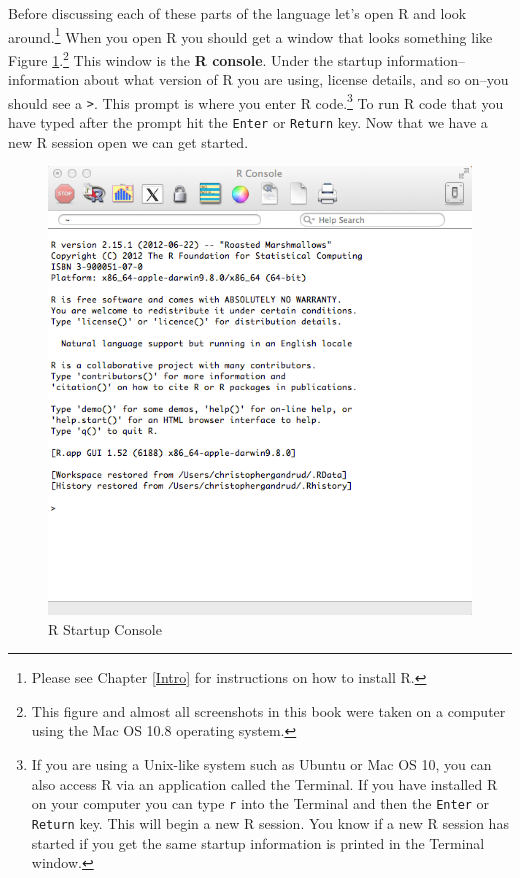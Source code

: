 Before discussing each of these parts of the language let's open R and look around.\footnote{Please see Chapter \ref{Intro} for instructions on how to install R.} When you open R you should get a window that looks something like Figure \ref{RBlankMain}.\footnote{This figure and almost all screenshots in this book were taken on a computer using the Mac OS 10.8 operating system.} This window is the {\bf{R console}}. Under the startup information--information about what version of R you are using, license details, and so on--you should see a {\tt{\textgreater}}. This prompt is where you enter R code.\footnote{If you are using a Unix-like system such as Ubuntu or Mac OS 10, you can also access R via an application called the Terminal. If you have installed R on your computer you can type {\tt{r}} into the Terminal and then the {\tt{Enter}} or {\tt{Return}} key. This will begin a new R session. You know if a new R session has started if you get the same startup information is printed in the Terminal window.} To run R code that you have typed after the prompt hit the {\tt{Enter}} or {\tt{Return}} key. Now that we have a new R session open we can get started. 

\begin{figure}[th!]
    \caption{R Startup Console}
    \label{RBlankMain}
    \begin{center}
    \includegraphics[scale=0.4]{Children/Chapter3/images3/BlankRConsole.png}
    \end{center}
\end{figure}

